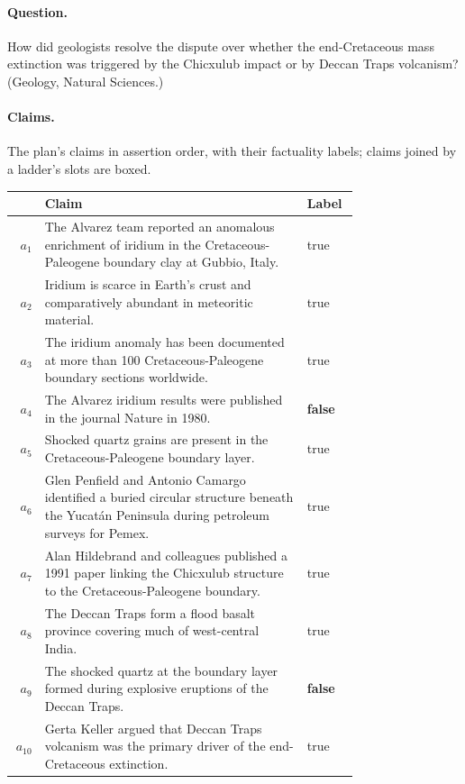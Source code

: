 \paragraph{Question.} How did geologists resolve the dispute over whether the end-Cretaceous mass extinction was triggered by the Chicxulub impact or by Deccan Traps volcanism? (Geology, Natural Sciences.)

\paragraph{Claims.} The plan's claims in assertion order, with their factuality labels; claims joined by a ladder's slots are boxed.

\begin{center}\scriptsize
\setlength{\tabcolsep}{2.5pt}
\begin{tabular}{@{}rp{0.76\linewidth}l@{}}
\toprule
& Claim & Label \\
\midrule
$a_{1}$ & The Alvarez team reported an anomalous enrichment of iridium in the Cretaceous-Paleogene boundary clay at Gubbio, Italy. & true \\
$a_{2}$ & Iridium is scarce in Earth's crust and comparatively abundant in meteoritic material. & true \\
$a_{3}$ & The iridium anomaly has been documented at more than 100 Cretaceous-Paleogene boundary sections worldwide. & true \\
$a_{4}$ & The Alvarez iridium results were published in the journal Nature in 1980. & \textbf{false} \\
$a_{5}$ & Shocked quartz grains are present in the Cretaceous-Paleogene boundary layer. & true \\
$a_{6}$ & Glen Penfield and Antonio Camargo identified a buried circular structure beneath the Yucatán Peninsula during petroleum surveys for Pemex. & true \\
$a_{7}$ & Alan Hildebrand and colleagues published a 1991 paper linking the Chicxulub structure to the Cretaceous-Paleogene boundary. & true \\
$a_{8}$ & The Deccan Traps form a flood basalt province covering much of west-central India. & true \\
$a_{9}$ & The shocked quartz at the boundary layer formed during explosive eruptions of the Deccan Traps. & \textbf{false} \\
$a_{10}$ & Gerta Keller argued that Deccan Traps volcanism was the primary driver of the end-Cretaceous extinction. & true \\

\end{tabular}
\end{center}
